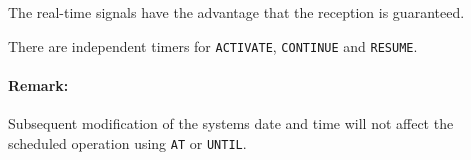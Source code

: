 The real-time signals have the advantage that the reception is guaranteed.

There are independent timers for \verb|ACTIVATE|, \verb|CONTINUE| 
and \verb|RESUME|.

\paragraph{Remark:} Subsequent modification of the systems date and time 
will not affect the scheduled operation using \verb|AT| or \verb|UNTIL|.

%
%
%
%
%

